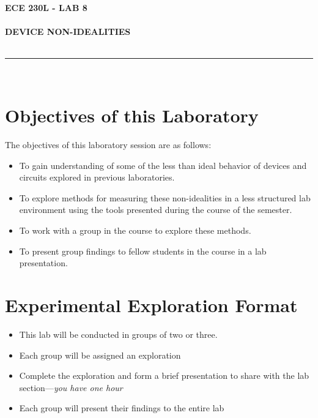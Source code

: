 \documentclass[12pt]{../manual}
\begin{document}
\begin{center}
\textbf{\huge ECE 230L - LAB 8}\\~\\
\textbf{\large DEVICE NON-IDEALITIES}\\~\\
\rule{6.5in}{0.5mm}\\
\end{center}

\tableofcontents

\listoffigures

\newpage
%
\section{Objectives of this Laboratory}
The objectives of this laboratory session are as follows:
\begin{itemize}
\item To gain understanding of some of the less than ideal behavior of devices and circuits explored in previous laboratories. 
\item To explore methods for measuring these non-idealities in a less structured lab environment using the tools presented during the course of the semester.
\item To work with a group in the course to explore these methods.
\item To present group findings to fellow students in the course in a lab presentation.
\end{itemize}

\section{Experimental Exploration Format}
\begin{itemize}
\item This lab will be conducted in groups of two or three. 
\item Each group will be assigned an exploration
\item Complete the exploration and form a brief presentation to share with the lab section---\textit{you have one hour}
\item Each group will present their findings to the entire lab
\end{itemize}

\newpage
\setcounter{section}{3}
{}
\end{document}
